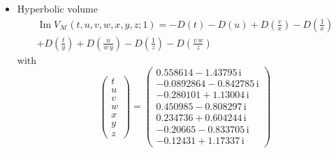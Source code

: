 \documentclass[12pt,reqno]{amsart}
\numberwithin{equation}{section}
\renewcommand{\Im}{\operatorname{Im}}
\newcommand{\I}{\mathrm{i}}
\begin{document}
\begin{itemize}
\item Hyperbolic volume
  \begin{multline*}
    \Im V_{\mathcal{M}}(t,u, v, w,x,y,z;1)
    =
    -D(t) - D\left(u  \right)
    + D \left( \frac{v}{x} \right)
    - D\left( \frac{1}{x} \right)
    \\
    + D\left(\frac{t}{y}\right)
    + D\left(\frac{u}{w \, y}\right)
    -  D\left(\frac{1}{ z}\right)
    - D\left(\frac{v \, w}{z}\right)
  \end{multline*}
  with
  \begin{equation*}
    \begin{pmatrix}
      t \\ u \\ v\\ w \\ x \\ y \\ z
    \end{pmatrix}
    =
    \begin{pmatrix}
       0.558614 - 1.43795 \, \I
       \\
       -0.0892864 - 0.842785 \, \I
       \\
       -0.280101 +1.13004 \, \I
       \\
       0.450985  - 0.808297 \, \I
       \\
       0.234736 +   0.604244 \, \I
       \\
       -0.20665 - 0.833705 \, \I
       \\
       -0.12431 + 1.17337 \, \I
     \end{pmatrix}
   \end{equation*}


\end{itemize}
\end{document}
